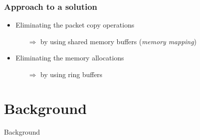 \documentclass{beamer}
\begin{document}
\begin{frame}
\frametitle{Approach to a solution}
\begin{itemize}
	\item Eliminating the packet copy operations
		\begin{itemize}
			\item [$\Rightarrow$] by using shared memory buffers (\emph{memory mapping})\newline
		\end{itemize}
	\item Eliminating the memory allocations
		\begin{itemize}
			\item [$\Rightarrow$] by using ring buffers
		\end{itemize}
\end{itemize}
\end{frame}

\section{Background}
\begin{frame}
	\begin{center}
	\huge{Background}
	\end{center}
\end{frame}
\end{document}
